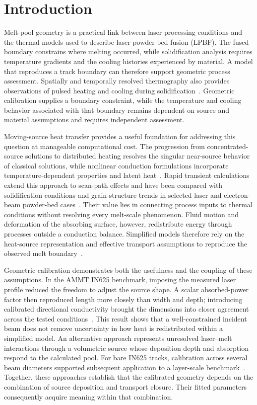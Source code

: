 \section{Introduction}
\label{sec:introduction}

Melt-pool geometry is a practical link between laser processing conditions and the thermal models used to describe laser powder bed fusion (LPBF). The fused boundary constrains where melting occurred, while solidification analysis requires temperature gradients and the cooling histories experienced by material. A model that reproduces a track boundary can therefore support geometric process assessment. Spatially and temporally resolved thermography also provides observations of pulsed heating and cooling during solidification~\cite{hooper2018}. Geometric calibration supplies a boundary constraint, while the temperature and cooling behavior associated with that boundary remains dependent on source and material assumptions and requires independent assessment.

Moving-source heat transfer provides a useful foundation for addressing this question at manageable computational cost. The progression from concentrated-source solutions to distributed heating resolves the singular near-source behavior of classical solutions, while nonlinear conduction formulations incorporate temperature-dependent properties and latent heat~\cite{vanelsen2007}. Rapid transient calculations extend this approach to scan-path effects and have been compared with solidification conditions and grain-structure trends in selected laser and electron-beam powder-bed cases~\cite{Plotkowski2017Rapid}. Their value lies in connecting process inputs to thermal conditions without resolving every melt-scale phenomenon. Fluid motion and deformation of the absorbing surface, however, redistribute energy through processes outside a conduction balance. Simplified models therefore rely on the heat-source representation and effective transport assumptions to reproduce the observed melt boundary~\cite{dynamic2024}.

Geometric calibration demonstrates both the usefulness and the coupling of these assumptions. In the AMMT IN625 benchmark, imposing the measured laser profile reduced the freedom to adjust the source shape. A scalar absorbed-power factor then reproduced length more closely than width and depth; introducing calibrated directional conductivity brought the dimensions into closer agreement across the tested conditions~\cite{kollmannsberger2019}. This result shows that a well-constrained incident beam does not remove uncertainty in how heat is redistributed within a simplified model. An alternative approach represents unresolved laser--melt interactions through a volumetric source whose deposition depth and absorption respond to the calculated pool. For bare IN625 tracks, calibration across several beam diameters supported subsequent application to a layer-scale benchmark~\cite{dynamic2024}. Together, these approaches establish that the calibrated geometry depends on the combination of source deposition and transport closure. Their fitted parameters consequently acquire meaning within that combination.

